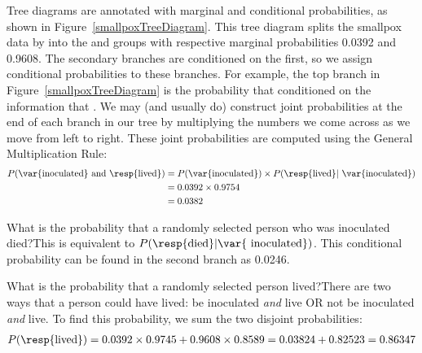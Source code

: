 Tree diagrams are annotated with marginal and conditional probabilities, as shown in Figure~\ref{smallpoxTreeDiagram}. This tree diagram splits the smallpox data by  into the  and  groups with respective marginal probabilities 0.0392 and 0.9608. The secondary branches are conditioned on the first, so we assign conditional probabilities to these branches. For example, the top branch in Figure~\ref{smallpoxTreeDiagram} is the probability that  conditioned on the information that . We may (and usually do) construct joint probabilities at the end of each branch in our tree by multiplying the numbers we come across as we move from left to right. These joint probabilities are computed using the General Multiplication Rule:
\begin{align*}
P(\text{\var{inoculated} and \resp{lived}}) &= P(\text{\var{inoculated}})\times P(\text{\resp{lived}}|\text{ \var{inoculated}}) \\
	&= 0.0392\times 0.9754 \\
	&=0.0382
\end{align*}
\begin{example}{What is the probability that a randomly selected person who was inoculated died?}This is equivalent to $P(\text{\resp{died}} | \text{\var{ inoculated}})$. This conditional probability can be found in the second branch as 0.0246.
\end{example}

\begin{example}{What is the probability that a randomly selected person lived?}There are two ways that a person could have lived:  be inoculated \emph{and} live OR not be inoculated \emph{and} live. To find this probability, we sum the two disjoint probabilities:
\begin{align*}
P(\text{\resp{lived}}) = 0.0392 \times 0.9745 + 0.9608 \times 0.8589 = 0.03824 + 0.82523 = 0.86347
\end{align*}
\end{example}

